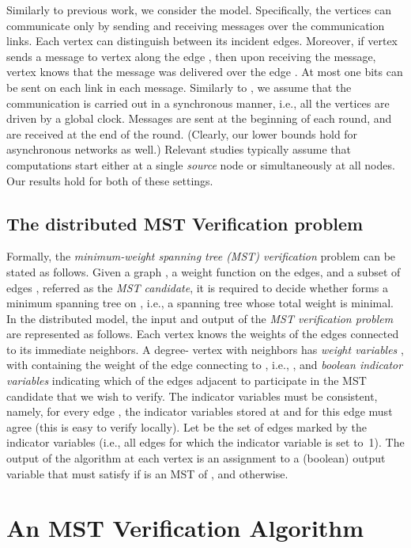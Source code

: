 \documentclass[11pt,letter]{article}
\begin{document}
Similarly to previous work, we consider the  model. 
Specifically, the vertices can communicate only by sending and receiving
messages over the communication links. 
Each vertex can distinguish between its incident edges. Moreover, 
if vertex  sends a message to vertex  along the edge ,
then upon receiving the message, vertex  knows that the message 
was delivered over the edge . At most one  bits can be sent 
on each link in each message. 
Similarly to  \cite{GKP98,KP_98}, we assume that the communication 
is carried out in a synchronous manner,
i.e., all the vertices are driven by a global clock.
Messages are sent at the beginning of each round, and are received at
the end of the round.
(Clearly, our lower bounds hold for asynchronous networks as well.)
Relevant studies typically assume that computations start 
either at a single {\em source} node or simultaneously at all nodes.
Our results hold for both of these settings.

\subsection{The distributed MST Verification problem}

Formally, the {\em minimum-weight spanning tree (MST) verification} problem can be 
stated as follows. Given a graph , a weight function  
on the edges, and a subset of edges , referred as the 
{\em MST candidate},  it is required to decide whether   forms a minimum  
spanning tree on , i.e., a spanning tree  whose total weight 
 is minimal.
In the distributed model, the input and output of the 
{\em MST verification problem} are represented as follows.
Each vertex knows the weights of the edges connected to its 
immediate neighbors. A degree- vertex  with
neighbors  has  {\em weight variables}
, with  containing the weight of the edge
connecting  to , i.e., , and  
{\em boolean indicator variables}   indicating which 
of the edges adjacent to   participate in the MST candidate that we wish 
to verify. The indicator variables must be consistent, namely, 
for every edge , the indicator variables stored at  and  
for this edge must agree (this is easy to verify locally). 
Let  be the set of edges marked by the indicator variables 
(i.e., all edges for which the indicator variable is set to~1).
The output of the algorithm at each vertex  
is an assignment to a (boolean) output variable  that must satisfy 
if  is an MST of , and  otherwise.

\section{An MST Verification Algorithm}
\label{sec:alg}
\end{document}
